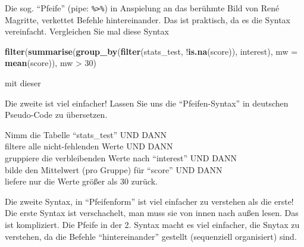 \documentclass[12pt,ngerman,]{book}
\makeatletter
\newenvironment{Shaded}{\begin{snugshade}}{\end{snugshade}}
\newcommand{\KeywordTok}[1]{\textcolor[rgb]{0.13,0.29,0.53}{\textbf{{#1}}}}
\newcommand{\DataTypeTok}[1]{\textcolor[rgb]{0.13,0.29,0.53}{{#1}}}
\newcommand{\DecValTok}[1]{\textcolor[rgb]{0.00,0.00,0.81}{{#1}}}
\newcommand{\StringTok}[1]{\textcolor[rgb]{0.31,0.60,0.02}{{#1}}}
\newcommand{\CommentTok}[1]{\textcolor[rgb]{0.56,0.35,0.01}{\textit{{#1}}}}
\newcommand{\NormalTok}[1]{{#1}}
\newenvironment{kframe}{%
\medskip{}
\setlength{\fboxsep}{.8em}
 \def\at@end@of@kframe{}%
 \ifinner\ifhmode%
  \def\at@end@of@kframe{\end{minipage}}%
  \begin{minipage}{\columnwidth}%
 \fi\fi%
 \def\FrameCommand##1{\hskip\@totalleftmargin \hskip-\fboxsep
 \colorbox{shadecolor}{##1}\hskip-\fboxsep
     \hskip-\linewidth \hskip-\@totalleftmargin \hskip\columnwidth}%
 \MakeFramed {\advance\hsize-\width
   \@totalleftmargin\z@ \linewidth\hsize
   \@setminipage}}%
 {\par\unskip\endMakeFramed%
 \at@end@of@kframe}
\renewenvironment{Shaded}{\begin{kframe}}{\end{kframe}}
\let\BeginKnitrBlock\begin \let\EndKnitrBlock\end
\makeatother
\begin{document}
Die sog. ``Pfeife'' (pipe: \texttt{\%\textgreater{}\%}) in
Anspielung an das berühmte Bild von René Magritte, verkettet Befehle
hintereinander. Das ist praktisch, da es die Syntax vereinfacht.
Vergleichen Sie mal diese Syntax

\begin{Shaded}
\begin{Highlighting}[]
\KeywordTok{filter}\NormalTok{(}\KeywordTok{summarise}\NormalTok{(}\KeywordTok{group_by}\NormalTok{(}\KeywordTok{filter}\NormalTok{(stats_test, }
       \NormalTok{!}\KeywordTok{is.na}\NormalTok{(score)), interest), }\DataTypeTok{mw =} \KeywordTok{mean}\NormalTok{(score)), mw >}\StringTok{ }\DecValTok{30}\NormalTok{)}
\end{Highlighting}
\end{Shaded}

mit dieser

\begin{Shaded}
\end{Shaded}

Die zweite ist viel einfacher! Lassen Sie uns die ``Pfeifen-Syntax'' in
deutschen Pseudo-Code zu übersetzen.

\BeginKnitrBlock{rmdpseudocode}
Nimm die Tabelle ``stats\_test'' UND DANN\\
filtere alle nicht-fehlenden Werte UND DANN\\
gruppiere die verbleibenden Werte nach ``interest'' UND DANN\\
bilde den Mittelwert (pro Gruppe) für ``score'' UND DANN\\
liefere nur die Werte größer als 30 zurück.
\EndKnitrBlock{rmdpseudocode}

Die zweite Syntax, in ``Pfeifenform'' ist viel einfacher zu verstehen
als die erste! Die erste Syntax ist verschachelt, man muss sie von innen
nach außen lesen. Das ist kompliziert. Die Pfeife in der 2. Syntax macht
es viel einfacher, die Snytax zu verstehen, da die Befehle
``hintereinander'' gestellt (sequenziell organisiert) sind.
\end{document}
